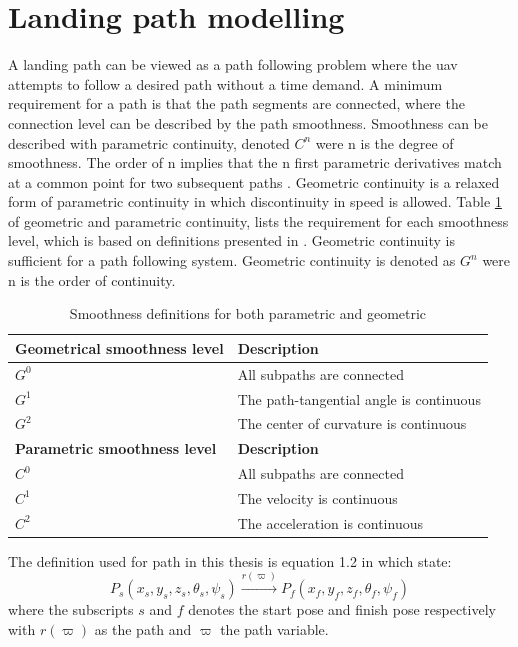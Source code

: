 \section{Landing path modelling}
A landing path can be viewed as a path following problem where the \gls{uav} attempts to follow a desired path without a time demand. A minimum requirement for a path is that the path segments are connected, where the connection level can be described by the path smoothness. Smoothness can be described with parametric continuity, denoted $C^n$ were n is the degree of smoothness. The order of n implies that the n first parametric derivatives match at a common point for two subsequent paths \citep{barsky1989geometric}. Geometric continuity is a relaxed form of parametric continuity in which discontinuity in speed is allowed. Table \ref{TB:SmoothnessDescriptions} of geometric and parametric continuity, lists the requirement for each smoothness level, which is based on definitions presented in \citep{barsky1989geometric}. Geometric continuity is sufficient for a path following system. Geometric continuity is denoted as $G^n$ were n is the order of continuity.
\begin{table}[H]
\begin{center}
\begin{tabular}{| l | l |}
\hline
\textbf{Geometrical smoothness level} & \textbf{Description} \\ \hline
$G^0$ & All subpaths are connected \\ \hline
$G^1$ & The path-tangential angle is continuous \\ \hline
$G^2$ & The center of curvature is continuous \\ \hline
\textbf{Parametric smoothness level} & \textbf{Description} \\ \hline
$C^0$ & All subpaths are connected \\ \hline
$C^1$ & The velocity is continuous \\ \hline
$C^2$ & The acceleration is continuous \\ \hline
\end{tabular}
\end{center}
\caption{Smoothness definitions for both parametric and geometric}
\label{TB:SmoothnessDescriptions}
\end{table} 
The definition used for path in this thesis is equation 1.2 in \citep{tsourdos2010cooperative} which state:
\begin{equation}
P_s(x_s,y_s,z_s,\theta_s,\psi_s) \xrightarrow{r(\varpi)} P_f(x_f,y_f,z_f,\theta_f,\psi_f)
\end{equation}
where the subscripts $s$ and $f$ denotes the start pose and finish pose respectively with $r(\varpi)$ as the path and $\varpi$ the path variable.

